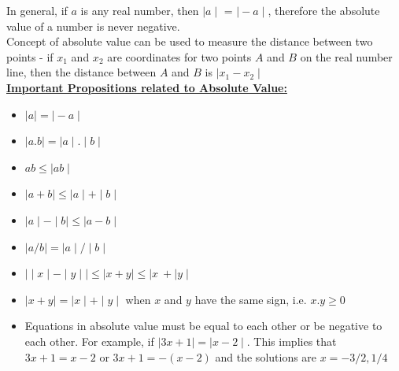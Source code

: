 \documentclass{book}
\begin{document}
In general,  if $a$ is any real number, then $\mid a \mid$ = $\mid -a \mid$, therefore the absolute value of a number is never negative. \\
Concept of absolute value can be used to measure the distance between two points - if $x_1$ and $x_2$ are coordinates for two points $A$ and $B$ on the real number line, then the distance between $A$ and $B$ is $\mid x_1 - x_2 \mid$ \\

\underline{\textbf{Important Propositions related to Absolute Value:}} \\

\begin{itemize}
	\item $\mid a \mid = \mid -a \mid$
	\item $\mid a.b \mid = \mid a \mid.\mid b \mid$
	\item $ab \leq \mid ab \mid$
	\item $\mid a+b \mid \leq \mid a \mid + \mid b \mid$
	\item $\mid a \mid - \mid b \mid \leq \mid a-b \mid$
	\item $\mid a/b \mid = \mid a \mid / \mid b \mid$
	\item $\mid \mid x \mid - \mid y \mid \mid \leq \mid x + y \mid \leq \mid x \ + \mid y \mid$
	\item $\mid x + y \mid = \mid x \mid + \mid y \mid$ when $x$ and $y$ have the same sign, i.e. $x.y \geq 0$
	\item Equations in absolute value must be equal to each other or be negative to each other. For example, if $\mid 3x +1\mid = \mid x-2 \mid $. This implies that $3x + 1 = x -2$ or $3x+1 = -(x-2)$ and the solutions are $x={-3/2,1/4}$
\end{itemize}
\end{document}
